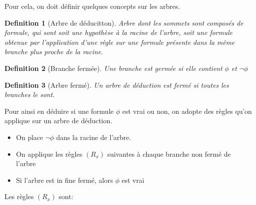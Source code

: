 \documentclass{paper}
\newtheorem{defi}{Definition}
\begin{document}
Pour cela, on doit définir quelques concepts sur les arbres.

\begin{defi}[Arbre de déducitton]
    Arbre dont les sommets sont composés de formule, qui sont soit une hypothèse à la racine de l'arbre, soit une formule obtenue par l'application d'une règle sur une formule présente dans la même branche plus proche de la racine.
\end{defi}

\begin{defi}[Branche fermée]
    Une branche est germée si elle contient $\phi$ et $\lnot\phi$
\end{defi}

\begin{defi}[Arbre fermé]
    Un arbre de déduction est fermé si toutes les branches le sont.
\end{defi}

Pour ainsi en déduire si une formule $\phi$ est vrai ou non, on adopte des règles qu'on applique sur un arbre de déduction.
\begin{itemize}
    \item On place $\lnot\phi$ dans la racine de l'arbre.
    \item On applique les règles $(R_x)$ suivantes à chaque branche non fermé de l'arbre
    \item Si l'arbre est in fine fermé, alors $\phi$ est vrai
\end{itemize}

Les règles $(R_x)$ sont:
\end{document}
